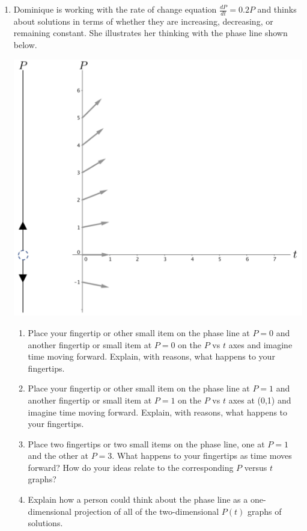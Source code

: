 \clearpage


\begin{enumerate}[resume]
\item Dominique is working with the rate of change equation $\frac{dP}{dt}=0.2P$  and thinks about solutions in terms of whether they are increasing, decreasing, or remaining constant. She illustrates her thinking with the phase line shown below. 
\begin{center}
\includegraphics[width=6in]{06/06PhaseLineAndSomeVectors.png} \\
\end{center}
\clearpage
\begin{enumerate}
\item	Place your fingertip or other small item on the phase line at $P = 0$ and another fingertip or small item at $P = 0$ on the $P$ vs $t$ axes and imagine time moving forward. Explain, with reasons, what happens to your fingertips. \label{06problem5parta} \vfill

\item	Place your fingertip or other small item on the phase line at $P = 1$ and another fingertip or small item at $P = 1$ on the $P$ vs $t$ axes at (0,1) and imagine time moving forward. Explain, with reasons, what happens to your fingertips. \label{06problem5partb}   \vfill

\item	Place two fingertips or two small items on the phase line, one at $P = 1$ and the other at $P = 3$. What happens to your fingertips as time moves forward? How do your ideas relate to the corresponding $P$ versus $t$ graphs? \label{06problem5partc}  \vfill

\item	Explain how a person could think about the phase line as a one-dimensional projection of all of the two-dimensional $P(t)$ graphs of solutions. \label{06problem5partd} \vfill

\end{enumerate}
\end{enumerate}
\clearpage


